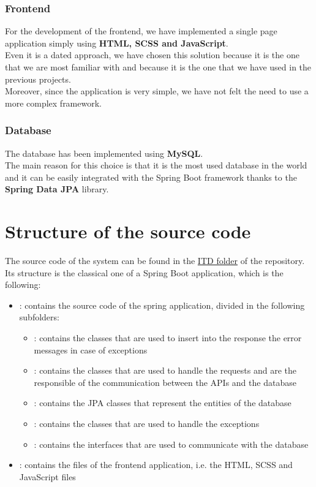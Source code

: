 \subsubsection{Frontend}
For the development of the frontend, we have implemented a single page application simply using \textbf{HTML, SCSS and JavaScript}.\\Even it is a dated approach, we have chosen this solution because it is the one that we are most familiar with and because it is the one that we have used in the previous projects.\\Moreover, since the application is very simple, we have not felt the need to use a more complex framework.

\subsubsection{Database}
The database has been implemented using \textbf{MySQL}.\\
The main reason for this choice is that it is the most used database in the world and it can be easily integrated with the Spring Boot framework thanks to the \textbf{Spring Data JPA} library.

\section{Structure of the source code}

The source code of the system can be found in the \href{https://github.com/pontig/sw-eng-2-PasiniPontiggiaStasi/tree/main/ITD/CodeKataBattle}{ITD folder} of the repository.\\
Its structure is the classical one of a Spring Boot application, which is the following:
\begin{itemize}
    \item {}: contains the source code of the spring application, divided in the following subfolders:
          \begin{itemize}
              \item {}: contains the classes that are used to insert into the response the error messages in case of exceptions
              \item {}: contains the classes that are used to handle the requests and are the responsible of the communication between the APIs and the database
              \item {}: contains the JPA classes that represent the entities of the database
              \item {}: contains the classes that are used to handle the exceptions
              \item {}: contains the interfaces that are used to communicate with the database
          \end{itemize}
    \item {}: contains the files of the frontend application, i.e. the HTML, SCSS and JavaScript files
\end{itemize}


